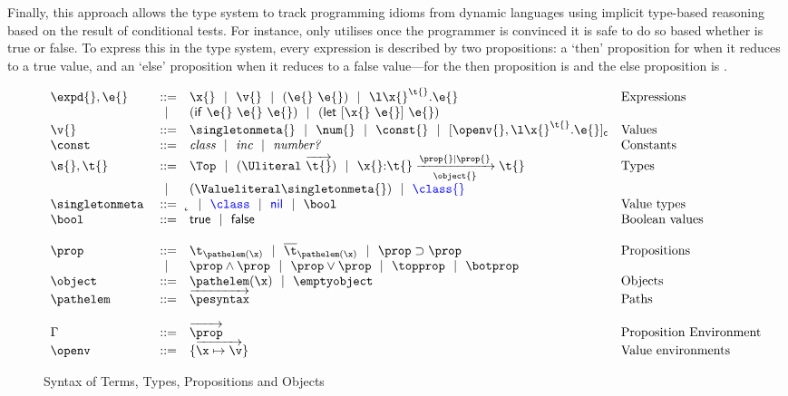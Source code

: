 Finally, this approach allows the type system to track
programming idioms from 
dynamic languages
using implicit type-based reasoning based on the result of
conditional tests.
For instance, 
only utilises  once
the programmer is convinced it is safe to do so based whether
is 
true or false. 
To express this in the type system, every expression 
is described by two propositions: a `then' proposition
for when it reduces to a true value, and an `else' proposition
when it reduces to a false value---for 
the then proposition is {\isprop{\NumberFull}{\x{}}} and 
the else proposition is {\notprop{\NumberFull}{\x{}}}.

\begin{figure}
  \footnotesize
$$
\begin{array}{lrll}
  \expd{}, \e{} &::=& \x{}
                      \alt \v{} 
                      \alt {\comb {\e{}} {\e{}}} 
                      \alt {\abs {\x{}} {\t{}} {\e{}}} &\mbox{Expressions} \\
                      &\alt& {\ifexp {\e{}} {\e{}} {\e{}}}
                      \alt {\letexp {\x{}} {\e{}} {\e{}}}\\
  \v{} &::=&          \singletonmeta{}
                      \alt {\num{}}
                      \alt {\const{}}
                      \alt {\closure {\openv{}} {\abs {\x{}} {\t{}} {\e{}}}}
                &\mbox{Values} \\
                \constantssyntax{}\\
  \s{}, \t{}    &::=& \Top 
                      \alt {\Unionsplice {\overrightarrow{\t{}}}}
                      \alt
                      {\ArrowOne {\x{}} {\t{}}
                                   {\t{}}
                                   {\filterset {\prop{}} {\prop{}}}
                                   {\object{}}}
                &\mbox{Types} \\
                      &\alt& {\Value \singletonmeta{}} 
                      \alt \trdiff{\class{}}\\
  \singletonallsyntax{}
                \\ \\
  \occurrencetypingsyntax{}\\
  \propenvsyntax{}\\
  \openvsyntax{}
\end{array}
$$
\caption{Syntax of Terms, Types, Propositions and Objects}
\label{main:figure:termsyntax}
\end{figure}


